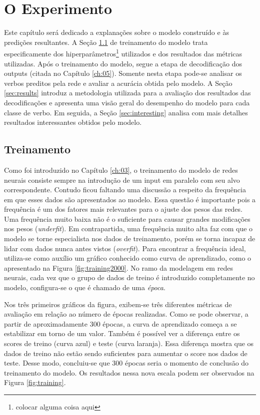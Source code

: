 \chapter{O Experimento}
\label{ch:07}

Este capítulo será dedicado a explanações sobre o modelo construído e às predições resultantes. A Seção \ref{sec:treinamento} de treinamento do modelo trata especificamente dos hiperparâmetros\footnote{colocar alguma coisa aqui} utilizados e dos resultados das métricas utilizadas. Após o treinamento do modelo, segue a etapa de decodificação dos outputs (citada no Capítulo \ref{ch:05}). Somente nesta etapa pode-se analisar os verbos preditos pela rede e avaliar a acurácia obtida pelo modelo. A Seção \ref{sec:results} introduz a metodologia utilizada para a avaliação dos resultados das decodificações e apresenta uma visão geral do desempenho do modelo para cada classe de verbo. Em seguida, a Seção \ref{sec:interesting} analisa com mais detalhes resultados interessantes obtidos pelo modelo. 

\section{Treinamento}
\label{sec:treinamento}

Como foi introduzido no Capítulo \ref{ch:03}, o treinamento do modelo de redes neurais consiste sempre na introdução de um input em paralelo com seu alvo correspondente. Contudo ficou faltando uma discussão a respeito da frequência em que esses dados são apresentados ao modelo. Essa questão é importante pois a frequência é um dos fatores mais relevantes para o ajuste dos pesos das redes. Uma frequência muito baixa não é o suficiente para causar grandes modificações nos pesos (\textit{underfit}). Em contrapartida, uma frequência muito alta faz com que o modelo se torne especialista nos dados de treinamento, porém se torna incapaz de lidar com dados nunca antes vistos (\textit{overfit}). Para encontrar a frequência ideal, utiliza-se como auxílio um gráfico conhecido como curva de aprendizado, como o apresentado na Figura \ref{fig:training2000}. No ramo da modelagem em redes neurais, cada vez que o grupo de dados de treino é introduzido completamente no modelo, configura-se o que é chamado de uma \textit{época}. 


Nos três primeiros gráficos da figura, exibem-se três diferentes métricas de avaliação em relação ao número de épocas realizadas. 
Como se pode observar, a partir de aproximadamente 300 épocas, a curva de aprendizado começa a se estabilizar em torno de um valor. Também é possível ver a diferença entre os scores de treino (curva azul) e teste (curva laranja). Essa diferença mostra que os dados de treino não estão sendo suficientes para aumentar o score nos dados de teste. Desse modo, concluiu-se que 300 épocas seria o momento de conclusão do treinamento do modelo. Os resultados nessa nova escala podem ser observados na Figura \ref{fig:training}.  

